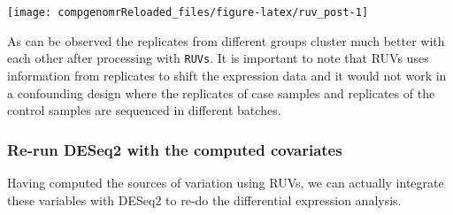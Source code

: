 \documentclass[12pt,]{krantz}
\begin{document}
\begin{center}\texttt{[image: compgenomrReloaded\_files/figure-latex/ruv\_post-1]} \end{center}

As can be observed the replicates from different groups cluster much better with each other after processing with \texttt{RUVs}. It is important to note that RUVs uses information from replicates to shift the expression data and it would not work in a confounding design where the replicates of case samples and replicates of the control samples are sequenced in different batches.

\hypertarget{re-run-deseq2-with-the-computed-covariates}{%
\subsubsection{Re-run DESeq2 with the computed covariates}\label{re-run-deseq2-with-the-computed-covariates}}

Having computed the sources of variation using RUVs, we can actually integrate these variables with DESeq2 to re-do the differential expression analysis.
\end{document}

